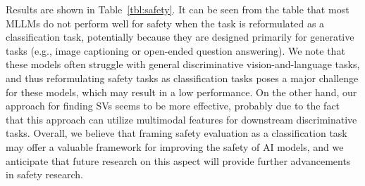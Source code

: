 Results are shown in Table~\ref{tbl:safety}. It can be seen from the table that most MLLMs do not perform well for safety when the task is reformulated as a classification task, potentially because they are designed primarily for generative tasks (e.g., image captioning or open-ended question answering). We note that these models often struggle with general discriminative vision-and-language tasks, and thus reformulating safety tasks as classification tasks poses a major challenge for these models, which may result in a low performance. On the other hand, our approach for finding SVs seems to be more effective, probably due to the fact that this approach can utilize multimodal features for downstream discriminative tasks. Overall, we believe that framing safety evaluation as a classification task may offer a valuable framework for improving the safety of AI models, and we anticipate that future research on this aspect will provide further advancements in safety research.









